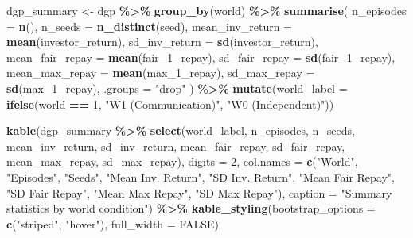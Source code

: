 \documentclass[
]{article}
\newenvironment{Shaded}{\begin{snugshade}}{\end{snugshade}}
\newcommand{\AttributeTok}[1]{\textcolor[rgb]{0.13,0.29,0.53}{#1}}
\newcommand{\ConstantTok}[1]{\textcolor[rgb]{0.56,0.35,0.01}{#1}}
\newcommand{\DecValTok}[1]{\textcolor[rgb]{0.00,0.00,0.81}{#1}}
\newcommand{\FunctionTok}[1]{\textcolor[rgb]{0.13,0.29,0.53}{\textbf{#1}}}
\newcommand{\NormalTok}[1]{#1}
\newcommand{\OtherTok}[1]{\textcolor[rgb]{0.56,0.35,0.01}{#1}}
\newcommand{\SpecialCharTok}[1]{\textcolor[rgb]{0.81,0.36,0.00}{\textbf{#1}}}
\newcommand{\StringTok}[1]{\textcolor[rgb]{0.31,0.60,0.02}{#1}}
\begin{document}
\begin{Shaded}
\begin{Highlighting}[]
\NormalTok{dgp\_summary }\OtherTok{\textless{}{-}}\NormalTok{ dgp }\SpecialCharTok{\%\textgreater{}\%}
  \FunctionTok{group\_by}\NormalTok{(world) }\SpecialCharTok{\%\textgreater{}\%}
  \FunctionTok{summarise}\NormalTok{(}
    \AttributeTok{n\_episodes =} \FunctionTok{n}\NormalTok{(),}
    \AttributeTok{n\_seeds =} \FunctionTok{n\_distinct}\NormalTok{(seed),}
    \AttributeTok{mean\_inv\_return =} \FunctionTok{mean}\NormalTok{(investor\_return),}
    \AttributeTok{sd\_inv\_return =} \FunctionTok{sd}\NormalTok{(investor\_return),}
    \AttributeTok{mean\_fair\_repay =} \FunctionTok{mean}\NormalTok{(fair\_1\_repay),}
    \AttributeTok{sd\_fair\_repay =} \FunctionTok{sd}\NormalTok{(fair\_1\_repay),}
    \AttributeTok{mean\_max\_repay =} \FunctionTok{mean}\NormalTok{(max\_1\_repay),}
    \AttributeTok{sd\_max\_repay =} \FunctionTok{sd}\NormalTok{(max\_1\_repay),}
    \AttributeTok{.groups =} \StringTok{"drop"}
\NormalTok{  ) }\SpecialCharTok{\%\textgreater{}\%}
  \FunctionTok{mutate}\NormalTok{(}\AttributeTok{world\_label =} \FunctionTok{ifelse}\NormalTok{(world }\SpecialCharTok{==} \DecValTok{1}\NormalTok{,}
                               \StringTok{"W1 (Communication)"}\NormalTok{, }\StringTok{"W0 (Independent)"}\NormalTok{))}

\FunctionTok{kable}\NormalTok{(dgp\_summary }\SpecialCharTok{\%\textgreater{}\%}
        \FunctionTok{select}\NormalTok{(world\_label, n\_episodes, n\_seeds,}
\NormalTok{               mean\_inv\_return, sd\_inv\_return,}
\NormalTok{               mean\_fair\_repay, sd\_fair\_repay,}
\NormalTok{               mean\_max\_repay, sd\_max\_repay),}
      \AttributeTok{digits =} \DecValTok{2}\NormalTok{,}
      \AttributeTok{col.names =} \FunctionTok{c}\NormalTok{(}\StringTok{"World"}\NormalTok{, }\StringTok{"Episodes"}\NormalTok{, }\StringTok{"Seeds"}\NormalTok{,}
                     \StringTok{"Mean Inv. Return"}\NormalTok{, }\StringTok{"SD Inv. Return"}\NormalTok{,}
                     \StringTok{"Mean Fair Repay"}\NormalTok{, }\StringTok{"SD Fair Repay"}\NormalTok{,}
                     \StringTok{"Mean Max Repay"}\NormalTok{, }\StringTok{"SD Max Repay"}\NormalTok{),}
      \AttributeTok{caption =} \StringTok{"Summary statistics by world condition"}\NormalTok{) }\SpecialCharTok{\%\textgreater{}\%}
  \FunctionTok{kable\_styling}\NormalTok{(}\AttributeTok{bootstrap\_options =} \FunctionTok{c}\NormalTok{(}\StringTok{"striped"}\NormalTok{, }\StringTok{"hover"}\NormalTok{),}
                \AttributeTok{full\_width =} \ConstantTok{FALSE}\NormalTok{)}
\end{Highlighting}
\end{Shaded}
\end{document}
